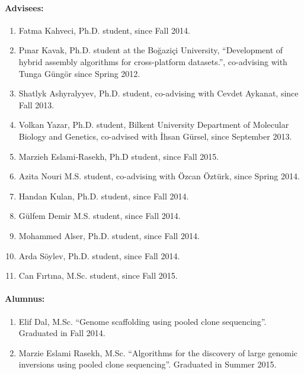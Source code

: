


\paragraph{Advisees:}


\begin{enumerate}
\item Fatma Kahveci, Ph.D. student, since Fall 2014.
\item Pınar Kavak, Ph.D. student at the Boğaziçi University, ``Development of hybrid assembly algorithms for cross-platform datasets.'', co-advising with Tunga Güngör since Spring 2012.
\item Shatlyk Ashyralyyev,  Ph.D. student, co-advising with Cevdet Aykanat, since Fall 2013.
\item Volkan Yazar,  Ph.D. student, Bilkent University Department of Molecular Biology and Genetics, co-advised with İhsan Gürsel, since September 2013.
\item Marzieh Eslami-Rasekh, Ph.D student, since Fall 2015.
\item Azita Nouri M.S. student, co-advising with Özcan Öztürk, since Spring 2014.
\item Handan Kulan,  Ph.D. student, since Fall 2014.
\item Gülfem Demir M.S. student, since Fall 2014.
\item Mohammed Alser,  Ph.D. student, since Fall 2014.
\item Arda Söylev,  Ph.D. student, since Fall 2014.
\item Can Fırtına, M.Sc. student, since Fall 2015.
\end{enumerate}

\paragraph{Alumnus:}

\begin{enumerate}
\item Elif Dal, M.Sc. ``Genome scaffolding using pooled clone sequencing''. Graduated in Fall 2014.
\item Marzie Eslami Rasekh, M.Sc. ``Algorithms for the discovery of large genomic inversions using pooled clone sequencing''. Graduated in Summer 2015.
\end{enumerate}

